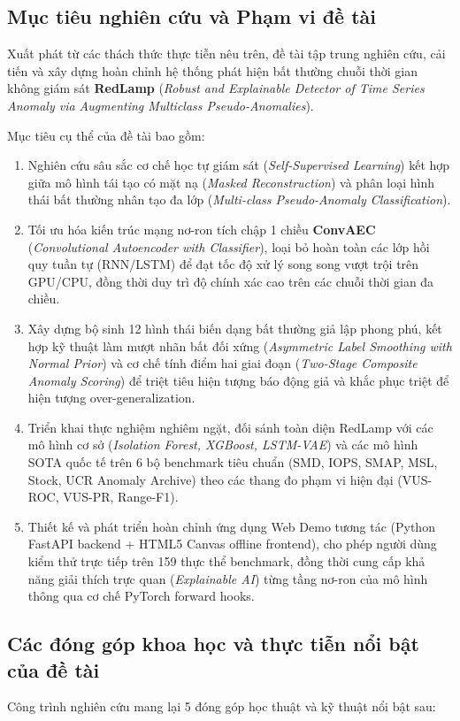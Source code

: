 \documentclass[11pt,journal,onecolumn]{IEEEtran}
\begin{document}
\subsection{Mục tiêu nghiên cứu và Phạm vi đề tài}
Xuất phát từ các thách thức thực tiễn nêu trên, đề tài tập trung nghiên cứu, cải tiến và xây dựng hoàn chỉnh hệ thống phát hiện bất thường chuỗi thời gian không giám sát \textbf{RedLamp} (\textit{Robust and Explainable Detector of Time Series Anomaly via Augmenting Multiclass Pseudo-Anomalies}).

Mục tiêu cụ thể của đề tài bao gồm:
\begin{enumerate}
    \item Nghiên cứu sâu sắc cơ chế học tự giám sát (\textit{Self-Supervised Learning}) kết hợp giữa mô hình tái tạo có mặt nạ (\textit{Masked Reconstruction}) và phân loại hình thái bất thường nhân tạo đa lớp (\textit{Multi-class Pseudo-Anomaly Classification}).
    \item Tối ưu hóa kiến trúc mạng nơ-ron tích chập 1 chiều \textbf{ConvAEC} (\textit{Convolutional Autoencoder with Classifier}), loại bỏ hoàn toàn các lớp hồi quy tuần tự (RNN/LSTM) để đạt tốc độ xử lý song song vượt trội trên GPU/CPU, đồng thời duy trì độ chính xác cao trên các chuỗi thời gian đa chiều.
    \item Xây dựng bộ sinh 12 hình thái biến dạng bất thường giả lập phong phú, kết hợp kỹ thuật làm mượt nhãn bất đối xứng (\textit{Asymmetric Label Smoothing with Normal Prior}) và cơ chế tính điểm hai giai đoạn (\textit{Two-Stage Composite Anomaly Scoring}) để triệt tiêu hiện tượng báo động giả và khắc phục triệt để hiện tượng over-generalization.
    \item Triển khai thực nghiệm nghiêm ngặt, đối sánh toàn diện RedLamp với các mô hình cơ sở (\textit{Isolation Forest, XGBoost, LSTM-VAE}) và các mô hình SOTA quốc tế trên 6 bộ benchmark tiêu chuẩn (SMD, IOPS, SMAP, MSL, Stock, UCR Anomaly Archive) theo các thang đo phạm vi hiện đại (VUS-ROC, VUS-PR, Range-F1).
    \item Thiết kế và phát triển hoàn chỉnh ứng dụng Web Demo tương tác (Python FastAPI backend + HTML5 Canvas offline frontend), cho phép người dùng kiểm thử trực tiếp trên 159 thực thể benchmark, đồng thời cung cấp khả năng giải thích trực quan (\textit{Explainable AI}) từng tầng nơ-ron của mô hình thông qua cơ chế PyTorch forward hooks.
\end{enumerate}

\subsection{Các đóng góp khoa học và thực tiễn nổi bật của đề tài}
\label{subsec:contributions}
Công trình nghiên cứu mang lại 5 đóng góp học thuật và kỹ thuật nổi bật sau:
\end{document}
